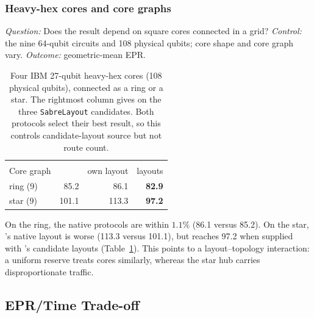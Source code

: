 \subsubsection{Heavy-hex cores and core graphs}
\label{sec:heavyhex}

\emph{Question:} Does the result depend on square cores connected in a
grid? \emph{Control:} the nine 64-qubit circuits and 108 physical qubits;
core shape and core graph vary. \emph{Outcome:} geometric-mean EPR.

\begin{table}[t]
\centering
\caption{Four IBM 27-qubit heavy-hex cores (108 physical qubits), connected
as a ring or a star. The rightmost column gives \PORTER{} on the three
\dSABRE{} \texttt{SabreLayout} candidates. Both protocols select their best
result, so this controls candidate-layout source but not route count.}
\label{tab:heavyhex}
\setlength{\tabcolsep}{4pt}
\small
\begin{tabular}{@{}l r rr@{}}
\toprule
& & \multicolumn{2}{c}{\PORTER{}} \\
\cmidrule(lr){3-4}
Core graph & \dSABRE{} & own layout & \dSABRE{} layouts \\
\midrule
ring (9)          &  85.2 &  86.1 & \textbf{82.9} \\
star (9)          & 101.1 & 113.3 & \textbf{97.2} \\
\bottomrule
\end{tabular}
\end{table}

On the ring, the native protocols are within $1.1\%$ (86.1 versus 85.2).
On the star, \PORTER{}'s native layout is worse (113.3 versus 101.1), but
\PORTER{} reaches 97.2 when supplied with \dSABRE{}'s candidate layouts
(Table~\ref{tab:heavyhex}). This points to a layout--topology interaction:
a uniform reserve treats cores similarly, whereas the star hub carries
disproportionate traffic.

\subsection{EPR/Time Trade-off}
\label{sec:frontier}
\label{sec:time}

\begin{table}[t]
\centering
\caption{Protocol trade-off over all 24 main-suite instances. Times are
complete protocol costs (geometric mean per instance).}
\label{tab:protocols}
\small
{}
\end{table}

